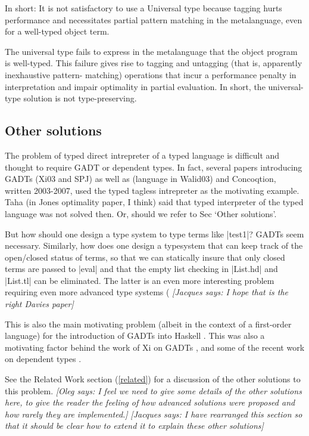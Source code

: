 \documentclass[preprint]{sigplanconf}
\newcommand{\jacques}[1]{{\it [Jacques says: #1]}}
\newcommand{\oleg}[1]{{\it [Oleg says: #1]}}
\let\cite=\citep
\begin{document}
In short: It is not satisfactory
to use a Universal type because tagging hurts performance and
necessitates partial pattern matching in the metalanguage, even for a
well-typed object term.  

The universal type fails to express in the metalanguage
that the object program is well-typed.  This failure gives rise to
tagging and untagging (that is, apparently inexhaustive pattern\hyp
matching) operations that incur a performance penalty in interpretation
and impair optimality in partial evaluation.  In short, the
universal\hyp type solution is not type\hyp preserving.

\subsection{Other solutions}

 The problem of typed direct
  intrepreter of a typed language is difficult and thought to require
  GADT or dependent types. 
  In fact, several papers introducing GADTs (Xi03 and SPJ) as well as 
  (language in Walid03) and Concoqtion, written 2003-2007, used the 
  typed tagless intrepreter as the motivating example.
  Taha (in Jones optimality paper, I think) said that typed
  interpreter of the typed language was not solved then.
  Or, should we refer to Sec `Other solutions'.

But how should one design a type system to type
terms like |test1|? GADTs seem necessary. Similarly, how does one design a
typesystem that can keep track of the open/closed status of terms, so that we
can statically insure that only closed terms are passed to |eval| and that
the empty list checking in |List.hd| and |List.tl| can be eliminated.
The latter is an even more interesting problem requiring even
more advanced type systems 
(\cite{WalidPOPLo3,NanevskiICFP02,NanevskiJFP05,DaviesJACM01}
\jacques{I hope that is the right Davies paper}

This is also the main motivating problem (albeit in the context of
a first-order language) for the introduction of GADTs 
into Haskell \cite{PeytonJonesICFP2006}.  This was also a motivating
factor behind the work of Xi on GADTs \cite{XiGADTs}, and some of the
recent work on dependent types \cite{WalidICFP02,WalidConcoqtion}.

See the Related Work section (\ref{related}) for a discussion of the other
solutions to this problem.
\oleg{I feel we need to give some details of the other solutions here, 
to give the reader the feeling of
how advanced solutions were proposed and how rarely they are
implemented.}
\jacques{I have rearranged this section so that it should be clear how
to extend it to explain these other solutions}
\end{document}

